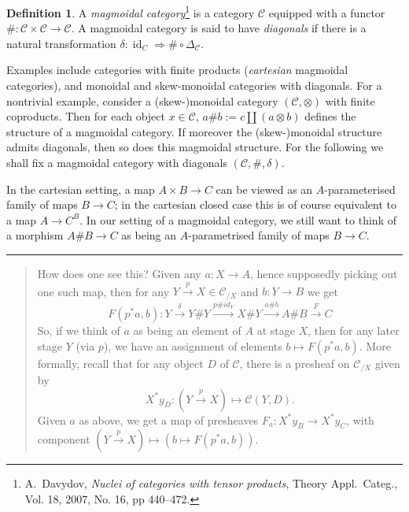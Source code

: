 \documentclass{tufte-handout}
\theoremstyle{definition}
\newtheorem*{definition}{Definition}
\DeclareMathOperator{\id}{id}
\DeclareMathOperator{\Pre}{Pre}
\def\CC{\mathcal{C}}
\begin{document}
\begin{definition}
A \emph{magmoidal category}\footnote{A.~Davydov, \emph{Nuclei of categories with tensor products}, Theory
Appl.\ Categ., Vol. 18, 2007, No. 16, pp 440--472.} is a category $\CC$ equipped with a functor $\# \colon \CC\times \CC\to \CC$.
A magmoidal category is said to have \emph{diagonals} if there is a natural transformation $\delta\colon \id_C \Rightarrow \#\circ \Delta_\CC$. 
\end{definition}


Examples include categories with finite products (\emph{cartesian} magmoidal categories), and monoidal and skew-monoidal categories with diagonals.
For a nontrivial example, consider a (skew-)monoidal category $(\mathcal{C},\otimes)$ with finite coproducts. 
Then for each object $x\in \mathcal{C}$, $a\# b := c\amalg (a\otimes b)$ defines the structure of a magmoidal category.
If moreover the (skew-)monoidal structure admits diagonals, then so does this magmoidal structure.
For the following we shall fix a magmoidal category with diagonals $(\CC,\#,\delta)$.


In the cartesian setting, a map $A\times B \to C$ can be viewed as an $A$-parameterised family of maps $B\to C$; in the cartesian closed case this is of course equivalent to a map $A \to C^B$.
In our setting of a magmoidal category, we still want to think of a morphism $A\# B \to C$ as being an $A$-parametrised family of maps $B\to C$.

\medskip

\hrule
\begin{quote}
\small How does one see this? Given any $a\colon X\to A$, hence supposedly picking out one such map, then for any $Y\xrightarrow{p} X \in \mathcal{C}_{/X}$ and $b\colon Y\to B$ we get 
\[
F(p^*a,b)\colon Y\xrightarrow{\delta} Y\# Y \xrightarrow{p\# id_Y} X\# Y \xrightarrow{a\# b} A \# B \xrightarrow{F} C
\] 
So, if we think of $a$ as being an element of $A$ at stage $X$, then for any later stage $Y$ (via $p$), we have an assignment of elements $b\mapsto F(p^*a,b)$.
More formally, recall that for any object $D$ of $\mathcal{C}$, there is a presheaf on $\mathcal{C}_{/X}$ given by 
\[
  X^*y_D\colon (Y\xrightarrow{p} X) \mapsto \mathcal{C}(Y,D).
\] 
Given $a$ as above, we get a map of presheaves $F_a\colon X^*y_B \to X^*y_C$, with component $(Y\xrightarrow{p} X)  \mapsto \left(b\mapsto F(p^*a,b)\right)$.
\end{quote}
\end{document}
